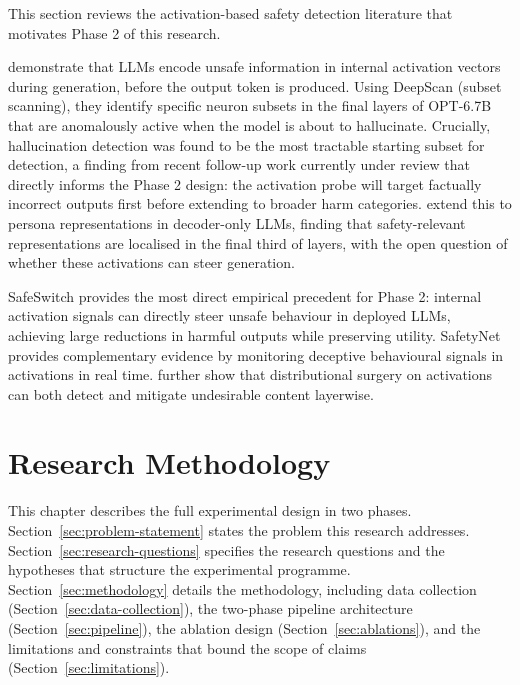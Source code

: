 \documentclass[a4paper,twoside,12pt]{report}
\begin{document}
This section reviews the activation-based safety detection literature that motivates Phase 2
of this research.

\citet{rateike2023} demonstrate that LLMs encode unsafe information in internal activation
vectors during generation, before the output token is produced. Using DeepScan (subset
scanning), they identify specific neuron subsets in the final layers of OPT-6.7B that are
anomalously active when the model is about to hallucinate. Crucially, hallucination detection
was found to be the most tractable starting subset for detection, a finding from recent
follow-up work currently under review that directly informs the Phase 2 design: the
activation probe will target factually incorrect outputs first before extending to broader
harm categories. \citet{cintas2025} extend this to persona representations in decoder-only
LLMs, finding that safety-relevant representations are localised in the final third of
layers, with the open question of whether these activations can steer generation.

SafeSwitch \citep{han2025safeswitch} provides the most direct empirical precedent for
Phase 2: internal activation signals can directly steer unsafe behaviour in deployed LLMs,
achieving large reductions in harmful outputs while preserving utility. SafetyNet
\citep{chaudhary2025safetynet} provides complementary evidence by monitoring deceptive
behavioural signals in activations in real time. \citet{nguyen2025distributional} further
show that distributional surgery on activations can both detect and mitigate undesirable
content layerwise.


\chapter{Research Methodology}
\label{ch:methodology}

This chapter describes the full experimental design in two phases.
Section~\ref{sec:problem-statement} states the problem this research addresses.
Section~\ref{sec:research-questions} specifies the research questions and the hypotheses
that structure the experimental programme. Section~\ref{sec:methodology} details the
methodology, including data collection (Section~\ref{sec:data-collection}), the two-phase
pipeline architecture (Section~\ref{sec:pipeline}), the ablation design
(Section~\ref{sec:ablations}), and the limitations and constraints that bound the scope of
claims (Section~\ref{sec:limitations}).
\end{document}
